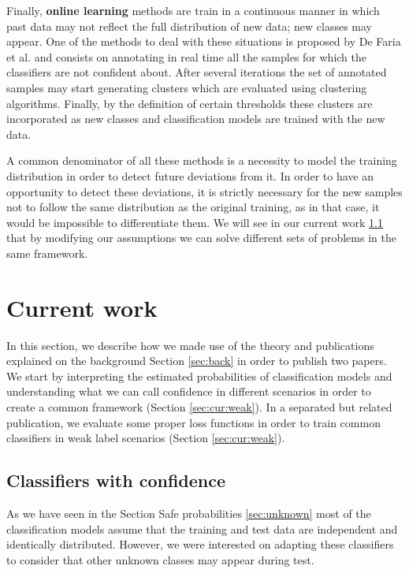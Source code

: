 \documentclass[a4paper, 12pt]{article}
\begin{document}
Finally, \textbf{online learning} methods are train in a continuous manner in which past data may not reflect the full distribution of new data; new classes may appear.
One of the methods to deal with these situations is proposed by De Faria et al. \cite{DeFaria2015} and consists on annotating in real time all the samples for which the classifiers are not confident about.
After several iterations the set of annotated samples may start generating clusters which are evaluated using clustering algorithms. Finally, by the definition of certain thresholds these clusters are incorporated as new classes and classification models are trained with the new data.

A common denominator of all these methods is a necessity to model the training distribution in order to detect future deviations from it.
In order to have an opportunity to detect these deviations, it is strictly necessary for the new samples not to follow the same distribution as the original training, as in that case, it would be impossible to differentiate them.
We will see in our current work \ref{sec:cur:bc} that by modifying our assumptions we can solve different sets of problems in the same framework.


\section{Current work}
\label{sec:cur}

In this section,  we describe how we made use of the theory and publications explained on the background Section \ref{sec:back} in order to publish two papers.
We start by interpreting the estimated probabilities of classification models and understanding what we can call confidence in different scenarios in order to create a common framework (Section \ref{sec:cur:weak}).
In a separated but related publication, we evaluate some proper loss functions in order to train common classifiers in weak label scenarios (Section \ref{sec:cur:weak}).

\subsection{Classifiers with confidence}
\label{sec:cur:bc}

As we have seen in the Section Safe probabilities \ref{sec:unknown} most of the classification models assume that the training and test data are independent and identically distributed.
However, we were interested on adapting these classifiers to consider that other unknown classes may appear during test.
\end{document}
